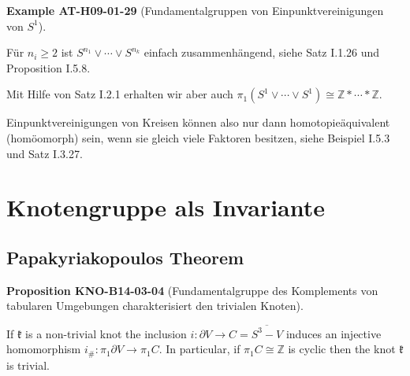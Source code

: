 \documentclass[10pt, letterpaper]{article}
\newcommand{\CustomHeading}[3]{%
  \par\medskip\noindent%
  \textbf{#1 #2} \textnormal{(#3)}.\enskip%
}
\newenvironment{PROP}[2]{\CustomHeading{Proposition}{#1}{#2}}{}
\newenvironment{EXA}[2]{\CustomHeading{Example}{#1}{#2}}{}
\begin{document}
\begin{EXA}{AT-H09-01-29}{Fundamentalgruppen von Einpunktvereinigungen von $S^1$}
Für $n_i \geq 2$ ist $S^{n_1} \vee \cdots \vee S^{n_k}$ einfach zusammenhängend, siehe Satz I.1.26 und Proposition I.5.8. 

Mit Hilfe von Satz I.2.1 erhalten wir aber auch $\pi_1\left(S^1 \vee \cdots \vee S^1\right) \cong \mathbb{Z} * \cdots * \mathbb{Z}$. 

Einpunktvereinigungen von Kreisen können also nur dann homotopieäquivalent (homöomorph) sein, wenn sie gleich viele Faktoren besitzen, siehe Beispiel I.5.3 und Satz I.3.27.
\end{EXA}

\section{Knotengruppe als Invariante}

\subsection{Papakyriakopoulos Theorem}

\begin{PROP}{KNO-B14-03-04}{Fundamentalgruppe des Komplements von tabularen Umgebungen charakterisiert den trivialen Knoten}
If $\mathfrak{k}$ is a non-trivial knot the inclusion $i: \partial V \rightarrow C=\overline{S^{3}-V}$ induces an injective homomorphism $i_{\#}: \pi_{1} \partial V \rightarrow \pi_{1} C$. In particular, if $\pi_{1} C \cong \mathbb{Z}$ is cyclic then the knot $\mathfrak{k}$ is trivial.
\end{PROP}
\end{document}
